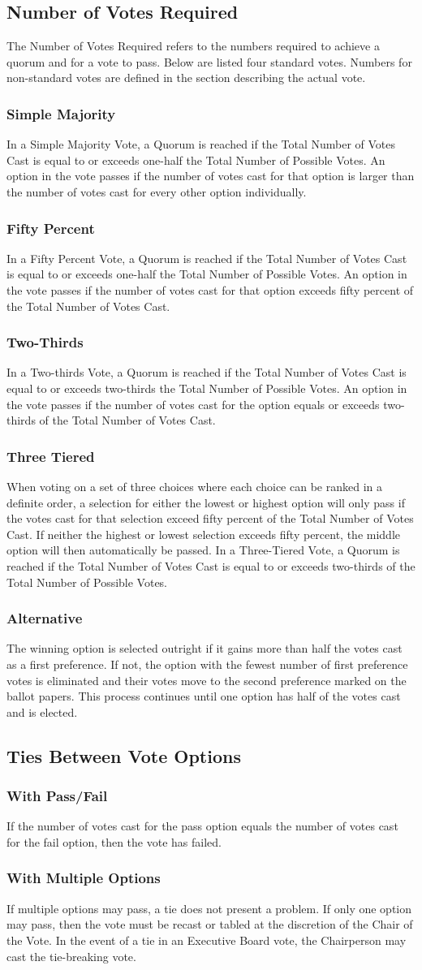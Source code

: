 \documentclass{article}
\newcommand{\asection}[1]{\subsection{#1} \label{#1}}
\newcommand{\asubsection}[1]{\subsubsection{#1} \label{#1}}
\begin{document}
\asection{Number of Votes Required}
The Number of Votes Required refers to the numbers required to achieve a quorum and for a vote to pass.
Below are listed four standard votes.
Numbers for non-standard votes are defined in the section describing the actual vote.
\asubsection{Simple Majority}
In a Simple Majority Vote, a Quorum is reached if the Total Number of Votes Cast is equal to or exceeds one-half the Total Number of Possible Votes.
An option in the vote passes if the number of votes cast for that option is larger than the number of votes cast for every other option individually.
\asubsection{Fifty Percent}
In a Fifty Percent Vote, a Quorum is reached if the Total Number of Votes Cast is equal to or exceeds one-half the Total Number of Possible Votes.
An option in the vote passes if the number of votes cast for that option exceeds fifty percent of the Total Number of Votes Cast.
\asubsection{Two-Thirds}
In a Two-thirds Vote, a Quorum is reached if the Total Number of Votes Cast is equal to or exceeds two-thirds the Total Number of Possible Votes.
An option in the vote passes if the number of votes cast for the option equals or exceeds two-thirds of the Total Number of Votes Cast.
\asubsection{Three Tiered}
When voting on a set of three choices where each choice can be ranked in a definite order, a selection for either the lowest or highest option will only pass if the votes cast for that selection exceed fifty percent of the Total Number of Votes Cast.
If neither the highest or lowest selection exceeds fifty percent, the middle option will then automatically be passed.
In a Three-Tiered Vote, a Quorum is reached if the Total Number of Votes Cast is equal to or exceeds two-thirds of the Total Number of Possible Votes.

\asubsection{Alternative}
The winning option is selected outright if it gains more than half the votes cast as a first preference.
If not, the option with the fewest number of first preference votes is eliminated and their votes move to the second preference marked on the ballot papers.
This process continues until one option has half of the votes cast and is elected.

\asection{Ties Between Vote Options}
\asubsection{With Pass/Fail}
If the number of votes cast for the pass option equals the number of votes cast for the fail option, then the vote has failed.
\asubsection{With Multiple Options}
If multiple options may pass, a tie does not present a problem.
If only one option may pass, then the vote must be recast or tabled at the discretion of the Chair of the Vote.
In the event of a tie in an Executive Board vote, the Chairperson may cast the tie-breaking vote.
\end{document}
